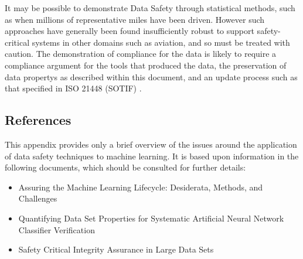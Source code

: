 It may be possible to demonstrate Data Safety through statistical methods,
such as when millions of representative miles have been driven.
However such approaches have generally been found insufficiently robust to support safety-critical systems in other domains
such as aviation, and so must be treated with caution.
The demonstration of compliance for the data is likely to require a compliance argument for the tools that produced the data,
the preservation of \glspl{data property} as described within this document, and an update process such as that specified in ISO 21448 (SOTIF)
\cite{citation:ISO21448}.

\subsection{References}
This appendix provides only a brief overview of the issues around the application of data safety techniques to machine learning. It is based upon \gls{information} in the following documents, which should be consulted for further details:
\begin{itemize}
\item Assuring the Machine Learning Lifecycle: Desiderata, Methods, and Challenges \cite{citation:Ashmore2019}
\item Quantifying Data Set Properties for Systematic Artificial Neural Network Classifier Verification \cite{citation:Hond2020}
\item Safety Critical Integrity Assurance in Large Data Sets \cite{citation:Sutherland2020}
\end{itemize}
